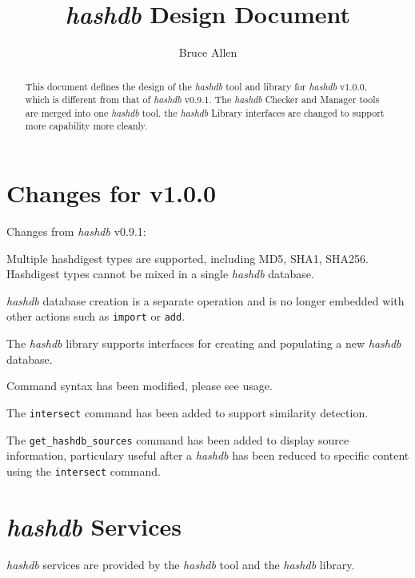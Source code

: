 \documentclass[12pt,twoside]{article}
\newcommand{\hdb}{\emph{hashdb}\xspace}
\begin{document}
\title{\hdb Design Document}
\author{Bruce Allen}
\maketitle

\begin{abstract}
This document defines the design of the \hdb tool and library
for \hdb v1.0.0, which is different from that of \hdb v0.9.1.
The \hdb Checker and Manager tools are merged into one \hdb tool.
the \hdb Library interfaces are changed to support more capability
more cleanly.
\end{abstract}

\section{Changes for v1.0.0}
Changes from \hdb v0.9.1:
\begin{compactitem}
\item Multiple hashdigest types are supported, including MD5, SHA1, SHA256.
Hashdigest types cannot be mixed in a single \hdb database.
\item \hdb database creation is a separate operation and is no longer embedded
with other actions such as \texttt{import} or \texttt{add}.
\item The \hdb library supports interfaces for creating and populating a new
\hdb database.
\item Command syntax has been modified, please see usage.
\item The \texttt{intersect} command has been added
to support similarity detection.
\item The \texttt{get\_hashdb\_sources} command has been added
to display source information, particulary useful after a \hdb
has been reduced to specific content using the \texttt{intersect} command.
\end{compactitem}

\section{\hdb Services}
\hdb services are provided by the \hdb tool and the \hdb library.
\end{document}
